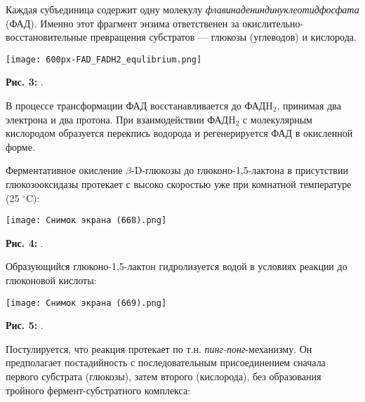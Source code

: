 \documentclass[a4paper]{article}
\begin{document}
Каждая субъединица содержит одну молекулу \textit{флавинадениндинуклеотидфосфата} (ФАД). Именно этот фрагмент энзима ответственен за окислительно-восстановительные превращения субстратов --- глюкозы (углеводов) и кислорода. 

\graphicspath{{./images/}}
		\begin{center}
		
			\texttt{[image: 600px-FAD\_FADH2\_equlibrium.png]}
    \par
\textbf{Рис. 3: }.
 \end{center}
\par \vspace{0.5 cm}

В процессе трансформации ФАД восстанавливается до ФАДH$_2$, принимая два электрона и два протона. При взаимодействии ФАДH$_2$ с молекулярным кислородом образуется перекпись водорода и регенерируется ФАД в окисленной форме. \par \vspace{0.2 cm}

Ферментативное окисление $\beta$-D-глюкозы до глюконо-1,5-лактона в присутствии глюкозооксидазы протекает с высоко скоростью уже при комнатной температуре (25 $^{\circ}$C):

\graphicspath{{./images/}}
		\begin{center}
		
			\texttt{[image: Снимок экрана (668).png]}
    \par
\textbf{Рис. 4: }.
 \end{center}
\par \vspace{0.5 cm}

Образующийся глюконо-1,5-лактон гидролизуется водой в условиях реакции до глюконовой кислоты:

\graphicspath{{./images/}}
		\begin{center}
		
			\texttt{[image: Снимок экрана (669).png]}
    \par
\textbf{Рис. 5: }.
 \end{center}
\par \vspace{0.5 cm}

Постулируется, что реакция протекает по т.н. \textit{пинг-понг}-механизму. Он предполагает постадийность с последовательным присоединением сначала первого субстрата (глюкозы), затем второго (кислорода), без образования тройного фермент-субстратного комплекса:
\end{document}
